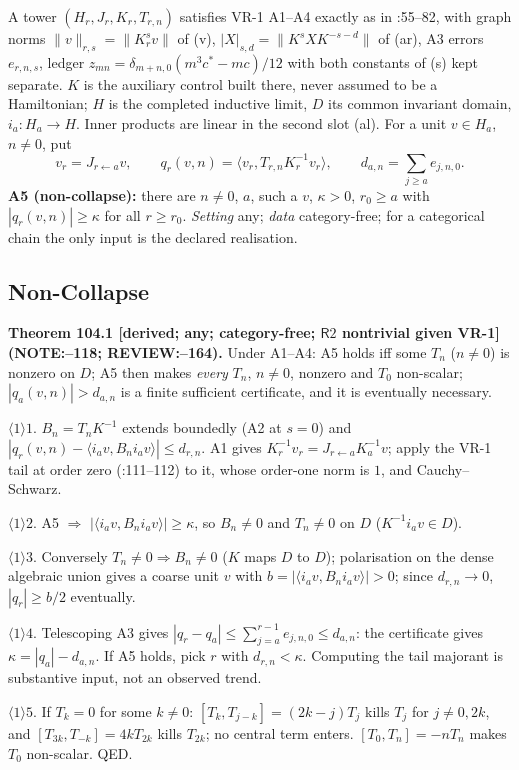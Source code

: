 A tower \((H_r,J_r,K_r,T_{r,n})\) satisfies VR-1 A1--A4 exactly as in :55--82, with graph norms
\(\|v\|_{r,s}=\|K_r^sv\|\) of (v), \(|X|_{s,d}=\|K^sXK^{-s-d}\|\) of (ar), A3 errors \(e_{r,n,s}\), ledger
\(z_{mn}=\delta_{m+n,0}(m^3c^*-mc)/12\) with both constants of (s) kept separate. \(K\) is the auxiliary control built
there, never assumed to be a Hamiltonian; \(H\) is the completed inductive limit, \(D\) its common invariant domain,
\(i_a:H_a\to H\). Inner products are linear in the second slot (al). For a unit \(v\in H_a\), \(n\neq0\), put
\[
 v_r=J_{r\leftarrow a}v,\qquad q_r(v,n)=\langle v_r,T_{r,n}K_r^{-1}v_r\rangle,\qquad d_{a,n}=\textstyle\sum_{j\ge a}e_{j,n,0}.
\]
\textbf{A5 (non-collapse):} there are \(n\neq0\), \(a\), such a \(v\), \(\kappa>0\), \(r_0\ge a\) with \(|q_r(v,n)|\ge\kappa\) for all \(r\ge r_0\).
\emph{Setting} any; \emph{data} category-free; for a categorical chain the only input is the declared realisation.

\subsection{Non-Collapse}

\textbf{Theorem 104.1 [derived; any; category-free; \(\mathsf R2\) nontrivial given VR-1] (NOTE:--118; REVIEW:--164).}
Under A1--A4: A5 holds iff some \(T_n\) (\(n\neq0\)) is nonzero on \(D\); A5 then makes \emph{every} \(T_n\), \(n\neq0\), nonzero and
\(T_0\) non-scalar; \(|q_a(v,n)|>d_{a,n}\) is a finite sufficient certificate, and it is eventually necessary.
\par\(\langle1\rangle1\). \(B_n=T_nK^{-1}\) extends boundedly (A2 at \(s=0\)) and \(|q_r(v,n)-\langle i_av,B_ni_av\rangle|\le d_{r,n}\).
A1 gives \(K_r^{-1}v_r=J_{r\leftarrow a}K_a^{-1}v\); apply the VR-1 tail at order zero (:111--112) to it,
whose order-one norm is \(1\), and Cauchy--Schwarz.
\par\(\langle1\rangle2\). A5 \(\Rightarrow\) \(|\langle i_av,B_ni_av\rangle|\ge\kappa\), so \(B_n\neq0\) and \(T_n\neq0\) on \(D\) (\(K^{-1}i_av\in D\)).
\par\(\langle1\rangle3\). Conversely \(T_n\neq0\Rightarrow B_n\neq0\) (\(K\) maps \(D\) to \(D\)); polarisation on the dense algebraic union gives a
coarse unit \(v\) with \(b=|\langle i_av,B_ni_av\rangle|>0\); since \(d_{r,n}\to0\), \(|q_r|\ge b/2\) eventually.
\par\(\langle1\rangle4\). Telescoping A3 gives \(|q_r-q_a|\le\sum_{j=a}^{r-1}e_{j,n,0}\le d_{a,n}\): the certificate gives \(\kappa=|q_a|-d_{a,n}\).
If A5 holds, pick \(r\) with \(d_{r,n}<\kappa\). Computing the tail majorant is substantive input, not an observed trend.
\par\(\langle1\rangle5\). If \(T_k=0\) for some \(k\neq0\): \([T_k,T_{j-k}]=(2k-j)T_j\) kills \(T_j\) for \(j\neq0,2k\), and
\([T_{3k},T_{-k}]=4kT_{2k}\) kills \(T_{2k}\); no central term enters. \([T_0,T_n]=-nT_n\) makes \(T_0\) non-scalar. QED.

